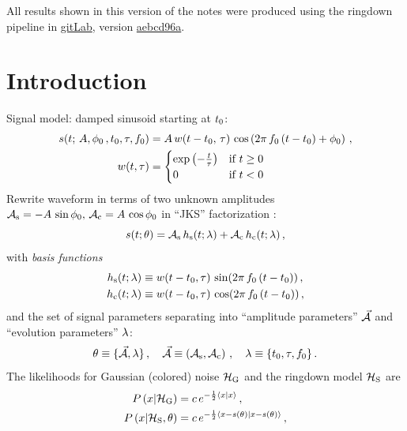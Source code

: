 \documentclass[aps,prd,onecolumn,notitlepage,nofootinbib,superscriptaddress,altaffilletter,floatfix]{revtex4-1}
\begin{document}
All results shown in this version of the notes were produced using the ringdown pipeline in
\href{https://git.ligo.org/BlackHole-QNM-Ringdown/Bayesian-QNM-PE-octave}{gitLab}, version
\href{https://git.ligo.org/BlackHole-QNM-Ringdown/Bayesian-QNM-PE-octave/commit/aebcd96ada3bb0aa393dc0f6bf13ea1a8503a5e3}{aebcd96a}.

\section{Introduction}
\label{Intro}

Signal model: damped sinusoid starting at $t_0$:
\begin{align}
  \label{eq:1}
  s(t;\,A, \phi_0\,, t_0, \tau, f_0) &= A\,w(t-t_0,\,\tau)\,\cos\left(2\pi\,f_0\,(t-t_0) + \phi_0\right)\,,\\
  w(t, \tau) &=
  \begin{cases}
    \exp\left( -\frac{t}{\tau} \right) & \text{if } t \ge 0\,\\
    0  & \text{if } t < 0
  \end{cases}
\end{align}
Rewrite waveform in terms of two unknown amplitudes $\mathcal{A}_{\mathrm{s}} = -A\,\sin\phi_0,\,\mathcal{A}_{\mathrm{c}} = A\,\cos\phi_0$ in ``JKS'' factorization
\cite{bretthorst1988:_bayesian_spectrum,jks98:_data}:
\begin{equation}
  \label{eq:2}
  s(t; \theta) = \mathcal{A}_{\mathrm{s}} \, h_\mathrm{s}(t;\lambda) + \mathcal{A}_{\mathrm{c}}\,h_\mathrm{c}(t;\lambda)\,,
\end{equation}
with \emph{basis functions}
\begin{align}
  \label{eq:14}
  h_\mathrm{s}(t;\lambda) &\equiv w(t-t_0,\tau)\,\sin(2\pi \,f_0\,(t-t_0))\,,\\
  h_\mathrm{c}(t;\lambda) &\equiv w(t-t_0,\tau)\,\cos(2\pi \,f_0\,(t-t_0))\,,
\end{align}
and the set of signal parameters separating into ``amplitude parameters'' $\vec{\mathcal{A}}$ and ``evolution parameters'' $\lambda$:
\begin{equation}
  \label{eq:11}
  \theta \equiv \{\vec{\mathcal{A}}, \lambda\}\,,
  \quad \vec{\mathcal{A}} \equiv \left(\mathcal{A}_{\mathrm{s}},\mathcal{A}_{\mathrm{c}}\right)\,,
  \quad \lambda \equiv \{t_0,\tau, f_0\}\,.
\end{equation}
The likelihoods for Gaussian (colored) noise $\mathcal{H}_{\mathrm{G}}$ and the ringdown model $\mathcal{H}_{\mathrm{S}}$ are
\begin{align}
  \label{eq:4}
  P\left(x|\mathcal{H}_{\mathrm{G}}\right) &= c\,e^{-\frac{1}{2}\langle x|x\rangle}\,,\\
  P\left(x|\mathcal{H}_{\mathrm{S}},\theta\right) &= c\,e^{-\frac{1}{2}\langle x-s(\theta)|x-s(\theta)\rangle}\,,
\end{align}
\end{document}
